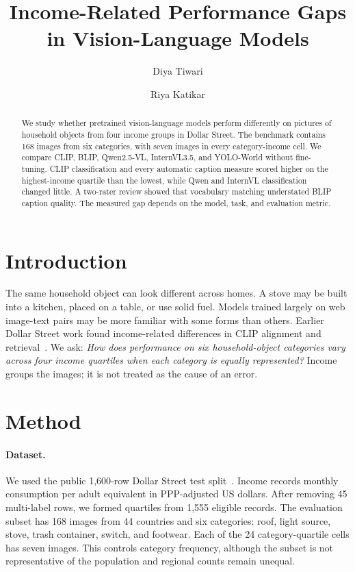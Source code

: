 \documentclass[10pt,twocolumn,letterpaper]{article}
\title{Income-Related Performance Gaps in Vision-Language Models}
\author{Diya Tiwari \and Riya Katikar}
\begin{document}
\maketitle

\begin{abstract}
We study whether pretrained vision-language models perform differently on pictures of household objects from four income groups in Dollar Street. The benchmark contains 168 images from six categories, with seven images in every category-income cell. We compare CLIP, BLIP, Qwen2.5-VL, InternVL3.5, and YOLO-World without fine-tuning. CLIP classification and every automatic caption measure scored higher on the highest-income quartile than the lowest, while Qwen and InternVL classification changed little. A two-rater review showed that vocabulary matching understated BLIP caption quality. The measured gap depends on the model, task, and evaluation metric.
\end{abstract}

\section{Introduction}
The same household object can look different across homes. A stove may be built into a kitchen, placed on a table, or use solid fuel. Models trained largely on web image-text pairs may be more familiar with some forms than others. Earlier Dollar Street work found income-related differences in CLIP alignment and retrieval~\cite{nwatu2023}. We ask: \emph{How does performance on six household-object categories vary across four income quartiles when each category is equally represented?} Income groups the images; it is not treated as the cause of an error.

\section{Method}
\paragraph{Dataset.} We used the public 1,600-row Dollar Street test split~\cite{rojas2022}. Income records monthly consumption per adult equivalent in PPP-adjusted US dollars. After removing 45 multi-label rows, we formed quartiles from 1,555 eligible records. The evaluation subset has 168 images from 44 countries and six categories: roof, light source, stove, trash container, switch, and footwear. Each of the 24 category-quartile cells has seven images. This controls category frequency, although the subset is not representative of the population and regional counts remain unequal.
\end{document}
